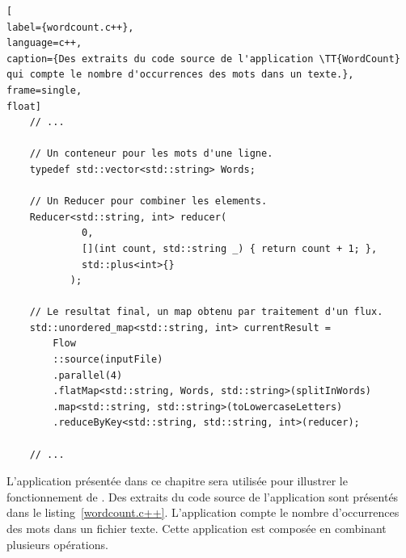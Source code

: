 \begin{lstlisting}[
label={wordcount.c++},
language=c++,
caption={Des extraits du code source de l'application \TT{WordCount} qui compte le nombre d'occurrences des mots dans un texte.},
frame=single,
float]
    // ...

    // Un conteneur pour les mots d'une ligne.
    typedef std::vector<std::string> Words;

    // Un Reducer pour combiner les elements.
    Reducer<std::string, int> reducer(
             0, 
             [](int count, std::string _) { return count + 1; },
             std::plus<int>{}
           );

    // Le resultat final, un map obtenu par traitement d'un flux.
    std::unordered_map<std::string, int> currentResult = 
        Flow
        ::source(inputFile)
        .parallel(4)
        .flatMap<std::string, Words, std::string>(splitInWords)			
        .map<std::string, std::string>(toLowercaseLetters)			
        .reduceByKey<std::string, std::string, int>(reducer); 

    // ...
\end{lstlisting}

L'application  pr\'esent\'ee dans ce chapitre sera utilisée pour illustrer le fonctionnement de . Des extraits du code source de l'application sont présentés dans le listing~\ref{wordcount.c++}. L'application compte le nombre d'occurrences des mots dans un fichier texte. Cette application est compos\'ee en combinant plusieurs op\'erations.



